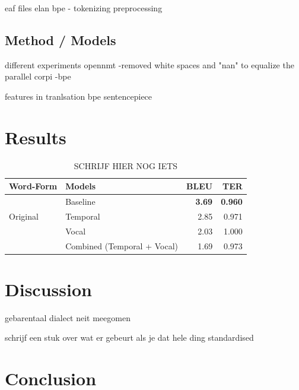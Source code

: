 eaf files
elan
bpe - tokenizing preprocessing


\subsection{Method / Models}

different experiments
opennmt 
-removed white spaces and "nan" to equalize the parallel corpi
-bpe

features in tranlsation
bpe
sentencepiece



\section{Results}

\begin{table}
    
    \label{tab:results}
    \begin{tabular}{llrr}
        \toprule
                                                                  
        Word-Form                   &  Models                           &  BLEU                & TER    \\ 
        \midrule
        \multirow{3}{*}{Original}  &  Baseline                              &   \textbf{3.69}      &  \textbf{0.960} \\
                              & Temporal                                &   2.85               &  0.971 \\
                              & Vocal                                   &   2.03               &  1.000 \\
                              & Combined (Temporal + Vocal)             &   1.69               &  0.973 \\
    
        
    \end{tabular}
    \caption{SCHRIJF HIER NOG IETS}
\end{table}


\section{Discussion}

gebarentaal dialect neit meegomen

schrijf een stuk over wat er gebeurt als je dat hele ding standardised

\section{Conclusion}


